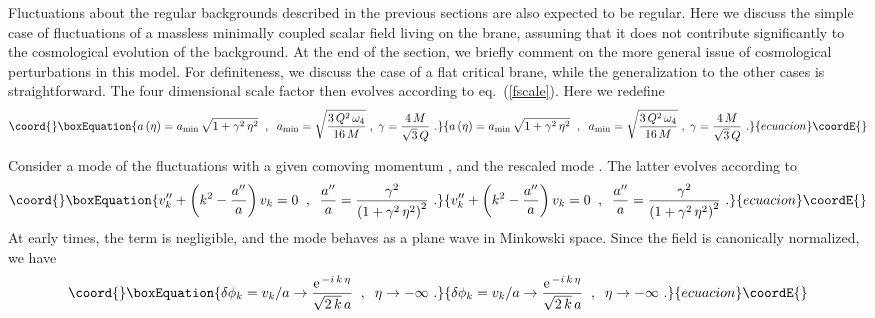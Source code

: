\documentclass[a4paper,11pt]{article}
\begin{document}
Fluctuations about the regular backgrounds described in the previous
sections are also expected to be regular. Here we discuss the simple case
of fluctuations of a massless minimally coupled scalar field \myHighlight{$\phi$}\coordHE{} living
on the brane, assuming that it does not contribute significantly to the
cosmological evolution of the background. At the end of the section, we
briefly comment on the more general issue of cosmological perturbations in
this model.  For definiteness, we discuss the case of a flat critical
brane, while the generalization to the other cases is straightforward. The
four dimensional scale factor then evolves according to
eq.~(\ref{fscale}). Here we redefine
%
\begin{equation}\coord{}\boxEquation{
a \left( \eta \right) = a_{\rm min} \, \sqrt{1+ \gamma^2 \, \eta^2} \;\;,\;\; a_{\rm min} = \sqrt{\frac{3 \, Q^2 \, \omega_4}{16 \, M}}
\;,\; \gamma=\frac{4\,M}{\sqrt{3}\,Q} \,\,.
\label{eqa}
}{
a \left( \eta \right) = a_{\rm min} \, \sqrt{1+ \gamma^2 \, \eta^2} \;\;,\;\; a_{\rm min} = \sqrt{\frac{3 \, Q^2 \, \omega_4}{16 \, M}}
\;,\; \gamma=\frac{4\,M}{\sqrt{3}\,Q} \,\,.
}{ecuacion}\coordE{}\end{equation}

Consider a mode of the fluctuations \coordHE{} with a given comoving
momentum \coordHE{}, and the rescaled mode \coordHE{}.
The latter evolves according to
%
\begin{equation}\coord{}\boxEquation{
v_k'' + \left( k^2 - \frac{a''}{a} \right) v_k = 0 \;\;,\;\; \frac{a''}{a} = \frac{\gamma^2}{\left( 1 + \gamma^2 \, \eta^2 \right)^2} \,\,.
\label{eqv}
}{
v_k'' + \left( k^2 - \frac{a''}{a} \right) v_k = 0 \;\;,\;\; \frac{a''}{a} = \frac{\gamma^2}{\left( 1 + \gamma^2 \, \eta^2 \right)^2} \,\,.
}{ecuacion}\coordE{}\end{equation}
%
At early times, the term \coordHE{} is negligible, and the mode behaves as a plane wave in Minkowski space. Since the field \coordHE{} is canonically normalized, we have
%
\begin{equation}\coord{}\boxEquation{
\delta \phi_k = v_k/a \rightarrow \frac{{\rm e}^{\,-i\,k\,\eta}}{\sqrt{2 \,k} \, a} \;\;,\;\; \eta \rightarrow - \infty \,\,.
\label{plane}
}{
\delta \phi_k = v_k/a \rightarrow \frac{{\rm e}^{\,-i\,k\,\eta}}{\sqrt{2 \,k} \, a} \;\;,\;\; \eta \rightarrow - \infty \,\,.
}{ecuacion}\coordE{}\end{equation}
\end{document}
